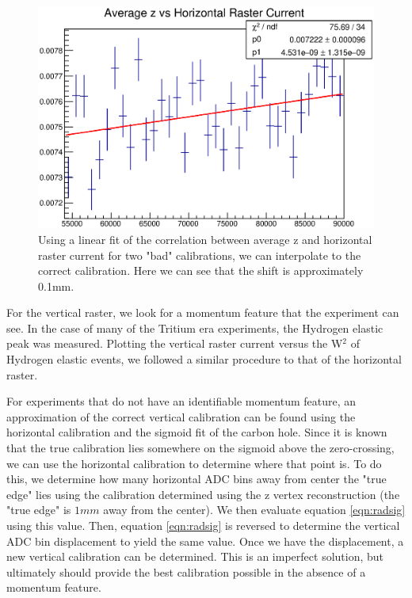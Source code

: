 \begin{figure}
	\includegraphics[width=\textwidth]{./chap3-analysis/fig/final_avgz.eps}
	\caption{Using a linear fit of the correlation between average z and horizontal raster current for two "bad" calibrations, we can interpolate to the correct calibration. Here we can see that the shift is approximately 0.1mm.}
\end{figure}

For the vertical raster, we look for a momentum feature that the experiment can see. In the case of many of the Tritium era experiments, the Hydrogen elastic peak was measured. Plotting the vertical raster current versus the W$^2$ of Hydrogen elastic events, we followed a similar procedure to that of the horizontal raster.

For experiments that do not have an identifiable momentum feature, an approximation of the correct vertical calibration can be found using the horizontal calibration and the sigmoid fit of the carbon hole. Since it is known that the true calibration lies somewhere on the sigmoid above the zero-crossing, we can use the horizontal calibration to determine where that point is. To do this, we determine how many horizontal ADC bins away from center the "true edge" lies using the calibration determined using the z vertex reconstruction (the "true edge" is $1mm$ away from the center). We then evaluate equation \ref{eqn:radsig} using this value. Then, equation \ref{eqn:radsig} is reversed to determine the vertical ADC bin displacement to yield the same value. Once we have the displacement, a new vertical calibration can be determined. This is an imperfect solution, but ultimately should provide the best calibration possible in the absence of a momentum feature.

